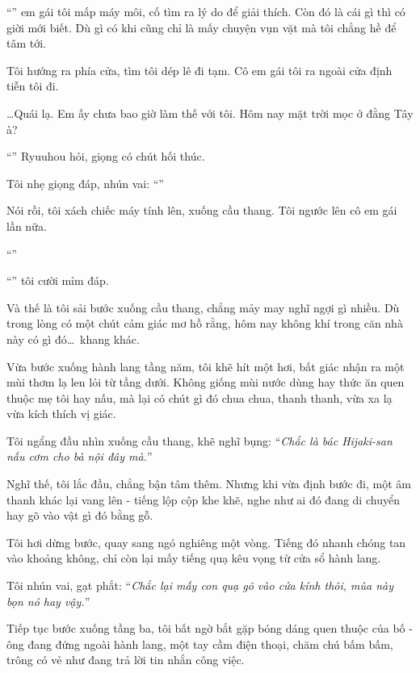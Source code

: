 \documentclass[../main.tex]{subfiles}
\begin{document}
``'' em gái tôi mấp máy môi, cố tìm ra lý do để giải thích. Còn đó là cái gì thì có giời mới biết. Dù gì có khi cũng chỉ là mấy chuyện vụn vặt mà tôi chẳng hề để tâm tới.

Tôi hướng ra phía cửa, tìm tôi dép lê đi tạm. Cô em gái tôi ra ngoài cửa định tiễn tôi đi.

\dots Quái lạ. Em ấy chưa bao giờ làm thế với tôi. Hôm nay mặt trời mọc ở đằng Tây à?

``'' Ryuuhou hỏi, giọng có chút hối thúc.

Tôi nhẹ giọng đáp, nhún vai: ``''

Nói rồi, tôi xách chiếc máy tính lên, xuống cầu thang. Tôi ngước lên cô em gái lần nữa.

``''

``'' tôi cười mỉm đáp.

Và thế là tôi sải bước xuống cầu thang, chẳng mảy may nghĩ ngợi gì nhiều. Dù trong lòng có một chút cảm giác mơ hồ rằng, hôm nay không khí trong căn nhà này có gì đó\dots\ khang khác.

Vừa bước xuống hành lang tầng năm, tôi khẽ hít một hơi, bất giác nhận ra một mùi thơm lạ len lỏi từ tầng dưới. Không giống mùi nước dùng hay thức ăn quen thuộc mẹ tôi hay nấu, mà lại có chút gì đó chua chua, thanh thanh, vừa xa lạ vừa kích thích vị giác.

Tôi ngẩng đầu nhìn xuống cầu thang, khẽ nghĩ bụng: ``\textit{Chắc là bác Hijaki-san nấu cơm cho bà nội đây mà.}''

Nghĩ thế, tôi lắc đầu, chẳng bận tâm thêm. Nhưng khi vừa định bước đi, một âm thanh khác lại vang lên - tiếng lộp cộp khe khẽ, nghe như ai đó đang di chuyển hay gõ vào vật gì đó bằng gỗ.

Tôi hơi dừng bước, quay sang ngó nghiêng một vòng. Tiếng đó nhanh chóng tan vào khoảng không, chỉ còn lại mấy tiếng quạ kêu vọng từ cửa sổ hành lang.

Tôi nhún vai, gạt phắt: ``\textit{Chắc lại mấy con quạ gõ vào cửa kính thôi, mùa này bọn nó hay vậy.}''

Tiếp tục bước xuống tầng ba, tôi bất ngờ bắt gặp bóng dáng quen thuộc của bố - ông đang đứng ngoài hành lang, một tay cầm điện thoại, chăm chú bấm bấm, trông có vẻ như đang trả lời tin nhắn công việc.
\end{document}
